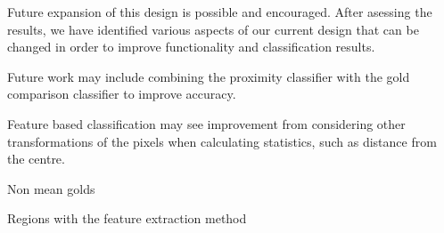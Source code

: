 Future expansion of this design is possible and encouraged. After asessing the results, we have identified various aspects of our current design that can be changed in order to improve functionality and classification results.

Future work may include combining the proximity classifier with the gold 
comparison classifier to improve accuracy. 

Feature based classification may see improvement from considering other
transformations of the pixels when calculating statistics, such as distance
from the centre.

Non mean golds

Regions with the feature extraction method
